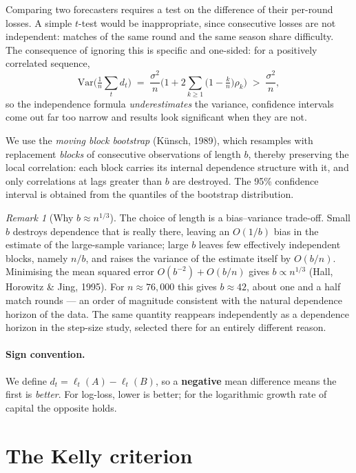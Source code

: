 \documentclass[12pt,a4paper,oneside]{report}
\renewcommand{\_}{\oldunderscore\allowbreak}
\theoremstyle{definition}
\theoremstyle{plain}
\theoremstyle{remark}
\newtheorem{remark}[theorem]{Remark}
\begin{document}
Comparing two forecasters requires a test on the difference of their per-round losses. A simple
$t$-test would be inappropriate, since consecutive losses are not independent: matches of the
same round and the same season share difficulty. The consequence of ignoring this is specific
and one-sided: for a positively correlated sequence,
\[
\mathrm{Var}\Big(\tfrac{1}{n}\sum_t d_t\Big) \;=\; \frac{\sigma^2}{n}
\Big( 1 + 2\sum_{k\geq 1} \big(1-\tfrac{k}{n}\big)\rho_k \Big) \;>\; \frac{\sigma^2}{n},
\]
so the independence formula \emph{underestimates} the variance, confidence intervals come out far
too narrow and results look significant when they are not.

We use the \emph{moving block bootstrap} (Künsch, 1989), which resamples with replacement
\emph{blocks} of consecutive observations of length $b$, thereby preserving the local
correlation: each block carries its internal dependence structure with it, and only correlations
at lags greater than $b$ are destroyed. The 95\% confidence interval is obtained from the
quantiles of the bootstrap distribution.

\begin{remark}[Why $b \approx n^{1/3}$]
The choice of length is a bias--variance trade-off. Small $b$ destroys dependence that is really
there, leaving an $O(1/b)$ bias in the estimate of the large-sample variance; large $b$ leaves
few effectively independent blocks, namely $n/b$, and raises the variance of the estimate itself
by $O(b/n)$. Minimising the mean squared error $O(b^{-2}) + O(b/n)$ gives $b \propto n^{1/3}$
(Hall, Horowitz \& Jing, 1995). For $n \approx 76{,}000$ this gives $b \approx 42$, about one and
a half match rounds --- an order of magnitude consistent with the natural dependence horizon of
the data. The same quantity reappears independently as a dependence horizon in the step-size
study, selected there for an entirely different reason.
\end{remark}

\paragraph{Sign convention.} We define $d_t = \ell_t(A) - \ell_t(B)$, so a \textbf{negative} mean
difference means the first is \emph{better}. For log-loss, lower is better; for the logarithmic
growth rate of capital the opposite holds.

\section{The Kelly criterion}
\label{sec:kelly-theory}
\end{document}
